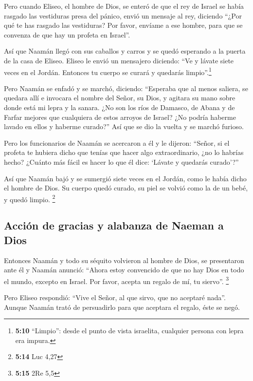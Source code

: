  Pero cuando Eliseo, el hombre de Dios, se enteró de que
el rey de Israel se había rasgado las vestiduras presa del pánico, envió
un mensaje al rey, diciendo ``¿Por qué te has rasgado las vestiduras?
Por favor, envíame a ese hombre, para que se convenza de que hay un
profeta en Israel''.

 Así que Naamán llegó con sus caballos y carros y se quedó
esperando a la puerta de la casa de Eliseo.  Eliseo le
envió un mensajero diciendo: ``Ve y lávate siete veces en el Jordán.
Entonces tu cuerpo se curará y quedarás limpio''.\footnote{\textbf{5:10}
  ``Limpio'': desde el punto de vista israelita, cualquier persona con
  lepra era impura.}

 Pero Naamán se enfadó y se marchó, diciendo: ``Esperaba
que al menos saliera, se quedara allí e invocara el nombre del Señor, su
Dios, y agitara su mano sobre donde está mi lepra y la sanara.
 ¿No son los ríos de Damasco, de Abana y de Farfar
mejores que cualquiera de estos arroyos de Israel? ¿No podría haberme
lavado en ellos y haberme curado?'' Así que se dio la vuelta y se marchó
furioso.

 Pero los funcionarios de Naamán se acercaron a él y le
dijeron: ``Señor, si el profeta te hubiera dicho que tenías que hacer
algo extraordinario, ¿no lo habrías hecho? ¿Cuánto más fácil es hacer lo
que él dice: `Lávate y quedarás curado'?''

 Así que Naamán bajó y se sumergió siete veces en el
Jordán, como le había dicho el hombre de Dios. Su cuerpo quedó curado,
su piel se volvió como la de un bebé, y quedó limpio. \footnote{\textbf{5:14}
  Luc 4,27}

\hypertarget{acciuxf3n-de-gracias-y-alabanza-de-naeman-a-dios}{%
\subsection{Acción de gracias y alabanza de Naeman a
Dios}\label{acciuxf3n-de-gracias-y-alabanza-de-naeman-a-dios}}

 Entonces Naamán y todo su séquito volvieron al hombre de
Dios, se presentaron ante él y Naamán anunció: ``Ahora estoy convencido
de que no hay Dios en todo el mundo, excepto en Israel. Por favor,
acepta un regalo de mí, tu siervo''. \footnote{\textbf{5:15} 2Re 5,5}

 Pero Eliseo respondió: ``Vive el Señor, al que sirvo,
que no aceptaré nada''. Aunque Naamán trató de persuadirlo para que
aceptara el regalo, éste se negó.

